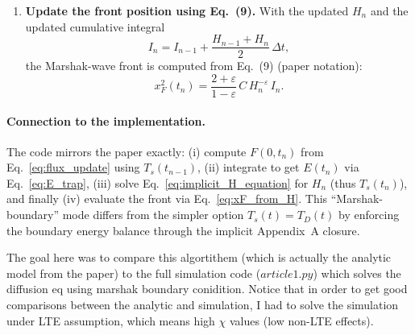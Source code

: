 \documentclass{article}
\begin{document}
\begin{enumerate}
    \item \textbf{Update the front position using Eq.~(9).}
    With the updated $H_n$ and the updated cumulative integral
    \begin{equation}
    I_n = I_{n-1} + \frac{H_{n-1}+H_n}{2}\,\Delta t,
    \end{equation}
    the Marshak-wave front is computed from Eq.~(9) (paper notation):
    \begin{equation}
    x_F^2(t_n)
    =
    \frac{2+\varepsilon}{1-\varepsilon}\,C\,H_n^{-\varepsilon}\,I_n.
    \label{eq:xF_from_H}
    \end{equation}
\end{enumerate}

\paragraph{Connection to the implementation.}
The code mirrors the paper exactly:
(i) compute $F(0,t_n)$ from Eq.~\eqref{eq:flux_update} using $T_s(t_{n-1})$,
(ii) integrate to get $E(t_n)$ via Eq.~\eqref{eq:E_trap},
(iii) solve Eq.~\eqref{eq:implicit_H_equation} for $H_n$ (thus $T_s(t_n)$),
and finally (iv) evaluate the front via Eq.~\eqref{eq:xF_from_H}.
This ``Marshak-boundary'' mode differs from the simpler option $T_s(t)=T_D(t)$ by enforcing the boundary energy balance through the implicit Appendix~A closure.

The goal here was to compare this algortithem (which is actually the analytic model from the paper) to the full simulation code ($article1.py$) which solves the diffusion eq using marshak boundary conidition. Notice that in order to get good comparisons between the analytic and simulation, I had to solve the simulation under LTE assumption, which means high $\chi$ values (low non-LTE effects).
\end{document}
